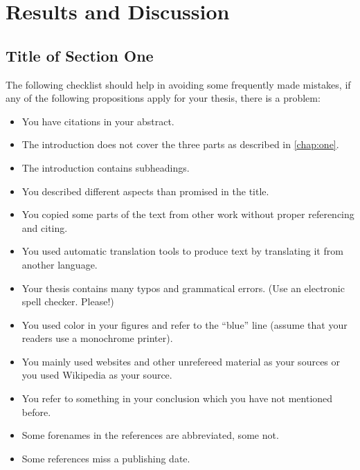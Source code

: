 \chapter{Results and Discussion}
\label{chap:five}

\section{Title of Section One}

The following checklist should help in avoiding some frequently made mistakes, if any of the following propositions apply for your thesis, there is a problem:

\begin{itemize} 
		\item You have citations in your abstract.
		\item The introduction does not cover the three parts as described in \autoref{chap:one}.
		\item The introduction contains subheadings.
		\item You described different aspects than promised in the title.
		\item You copied some parts of the text from other work without proper referencing and citing.
		\item You used automatic translation tools to produce text by translating it from another language.
		\item Your thesis contains many typos and grammatical errors. (Use an electronic spell checker. Please!)
		\item You used color in your figures and refer to the ``blue'' line (assume that your readers use a monochrome printer).
		\item You mainly used websites and other unrefereed material as your sources or you used Wikipedia as your source.
		\item You refer to something in your conclusion which you have not mentioned before.
		\item Some forenames in the references are abbreviated, some not.
		\item Some references miss a publishing date.
\end{itemize}


